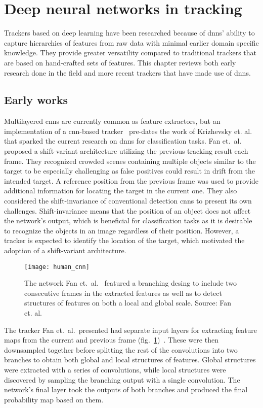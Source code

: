 \section{Deep neural networks in tracking}
Trackers based on deep learning have been researched because of \ac{dnn}s' ability
to capture hierarchies of features from raw data with minimal earlier domain specific
knowledge. They provide greater versatility compared to traditional trackers that are
based on hand-crafted sets of features. This chapter reviews both early research
done in the field and more recent trackers that have made use of \ac{dnn}s.

\subsection{Early works}
Multilayered \ac{cnn}s are currently common as feature extractors, but an implementation
of a \ac{cnn}-based tracker~\cite{HUMAN_CNN} pre-dates the work of Krizhevsky et.
al.~\cite{NIPS_IMAGENET} that sparked the current research on \ac{dnn}s for classification
tasks. Fan et.~al.~\cite{HUMAN_CNN} proposed a shift-variant architecture utilizing the
previous tracking result each frame. They recognized crowded scenes containing multiple
objects similar to the target to be especially challenging as false positives could result
in drift from the intended target. A reference position from the previous frame was used
to provide additional information for locating the target in the current one. They also
considered the shift-invariance of conventional detection \ac{cnn}s to present its
own challenges. Shift-invariance means that the position of an object does not affect the
network's output, which is beneficial for classification tasks as it is desirable to
recognize the objects in an image regardless of their position. However, a tracker is
expected to identify the location of the target, which motivated the adoption of a
shift-variant architecture.~\cite{HUMAN_CNN}

\begin{figure}[H]
\centering
\texttt{[image: human\_cnn]}
\caption{The network Fan et.~al.~\cite{HUMAN_CNN} featured a branching desing to
         include two consecutive frames in the extracted features as well as to detect
         structures of features on both a local and global scale. Source: Fan et.
         al.~\cite{HUMAN_CNN}}\label{fig:human_cnn}
\end{figure}

The tracker Fan et.~al.~presented had separate input layers for extracting feature
maps from the current and previous frame (fig.~\ref{fig:human_cnn})~\cite{HUMAN_CNN}.
These were then downsampled together before splitting the rest of the convolutions
into two branches to obtain both global and local structures of features. Global
structures were extracted with a series of convolutions, while local structures were
discovered by sampling the branching output with a single convolution. The network's
final layer took the outputs of both branches and produced the final probability map
based on them.~\cite{HUMAN_CNN}

